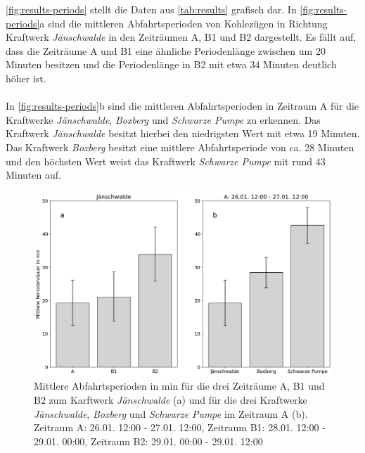 \autoref{fig:results-periods} stellt die Daten aus \autoref{tab:results} grafisch dar. In \autoref{fig:results-periods}a sind die mittleren Abfahrtsperioden von Kohlezügen in Richtung Kraftwerk \emph{Jänschwalde} in den Zeiträumen A, B1 und B2 dargestellt. Es fällt auf, dass die Zeiträume A und B1 eine ähnliche Periodenlänge zwischen um 20 Minuten besitzen und die Periodenlänge in B2 mit etwa 34 Minuten deutlich höher ist.\\
\\
In \autoref{fig:results-periods}b sind die mittleren Abfahrtsperioden in Zeitraum A für die Kraftwerke \emph{Jänschwalde}, \emph{Boxberg} und \emph{Schwarze Pumpe} zu erkennen. Das Kraftwerk \emph{Jänschwalde} besitzt hierbei den niedrigsten Wert mit etwa 19 Minuten. Das Kraftwerk \emph{Boxberg} besitzt eine mittlere Abfahrtsperiode von ca. 28 Minuten und den höchsten Wert weist das Kraftwerk \emph{Schwarze Pumpe} mit rund 43 Minuten auf.

\begin{figure}[!ht]
	\centering
	\includegraphics[width=1.0\linewidth]{images/results/periods.png}
	\caption{Mittlere Abfahrtsperioden in min für die drei Zeiträume A, B1 und B2 zum Karftwerk \emph{Jänschwalde} (a) und für die drei Kraftwerke \emph{Jänschwalde}, \emph{Boxberg} und \emph{Schwarze Pumpe} im Zeitraum A (b). Zeitraum A: 26.01. 12:00 - 27.01. 12:00, Zeitraum B1: 28.01. 12:00 - 29.01. 00:00, Zeitraum B2: 29.01. 00:00 - 29.01. 12:00}
	\label{fig:results-periods}
\end{figure}


